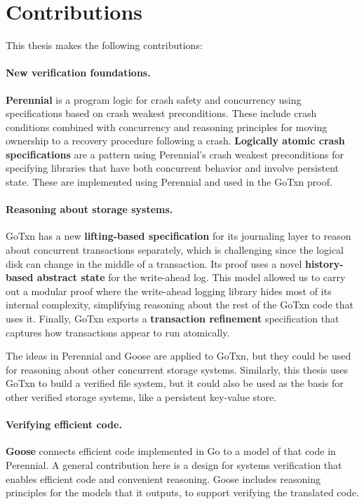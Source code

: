\section{Contributions}
\label{sec:intro:contributions}

This thesis makes the following contributions:

\paragraph{New verification foundations.}
\textbf{Perennial} is a program logic for crash safety
and concurrency using specifications based on crash weakest
preconditions. These include crash conditions combined with concurrency
and reasoning principles for moving ownership to a recovery procedure
following a crash. \textbf{Logically atomic crash specifications} are a
pattern using Perennial's crash weakest preconditions for specifying
libraries that have both concurrent behavior and involve persistent
state. These are implemented using Perennial and used in the GoTxn
proof.

\paragraph{Reasoning about storage systems.}
GoTxn has a new \textbf{lifting-based specification} for its journaling
layer to reason about concurrent transactions separately, which is
challenging since the logical disk can change in the middle of a transaction. Its proof uses a novel
\textbf{history-based abstract state} for the write-ahead log. This model allowed us to carry
out a modular proof where the write-ahead logging library hides most of
its internal complexity, simplifying reasoning about the rest of the GoTxn
code that uses it. Finally, GoTxn exports a \textbf{transaction refinement}
specification that captures how transactions appear to run atomically.

The ideas in Perennial and Goose are applied to GoTxn, but they could be used
for reasoning about other concurrent storage systems. Similarly,
this thesis uses GoTxn to build a verified file system, but it could also be used
as the basis for other verified storage systems, like a persistent key-value
store.

\paragraph{Verifying efficient code.}
\textbf{Goose} connects efficient code implemented in Go to a model of that code
in Perennial. A general contribution here is a design for systems verification
that enables efficient code and convenient reasoning. Goose includes reasoning
principles for the models that it outputs, to support verifying the translated
code.

